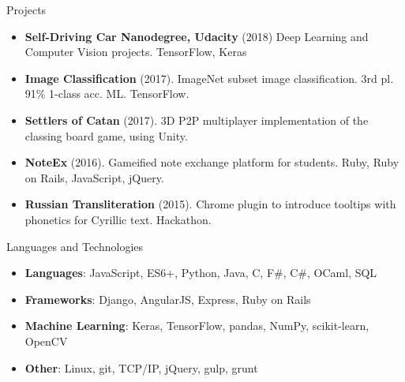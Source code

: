 \documentclass[]{muchicv}
\begin{document}
	\begin{cvsection}{Projects}
		\begin{cvsubsection}{}{}{}
			\begin{itemize}
				\item \textbf{Self-Driving Car Nanodegree, Udacity} (2018) Deep Learning and Computer Vision projects. TensorFlow, Keras
				\item \textbf{Image Classification} (2017). ImageNet subset image classification. 3rd pl. 91\% 1-class acc. ML. TensorFlow.
				\item \textbf{Settlers of Catan} (2017).  3D P2P multiplayer implementation of the classing board game, using Unity.
				\item \textbf{NoteEx} (2016). Gameified note exchange platform for students. Ruby, Ruby on Rails, JavaScript, jQuery.
				\item \textbf{Russian Transliteration} (2015). Chrome plugin to introduce tooltips with phonetics for Cyrillic text. Hackathon.
			\end{itemize}
		\end{cvsubsection}
	\end{cvsection}
	
	\begin{cvsection}{Languages and Technologies}
		\begin{cvsubsection}{}{}{}	
			\begin{itemize}
				\item \textbf{Languages}: JavaScript,  ES6+, Python, Java, C, F\#, C\#, OCaml, SQL 
				\item \textbf{Frameworks}: Django, AngularJS, Express, Ruby on Rails
				\item \textbf{Machine Learning}: Keras, TensorFlow, pandas, NumPy, scikit-learn, OpenCV
				\item \textbf{Other}: Linux, git, TCP/IP, jQuery, gulp, grunt
			\end{itemize}
		\end{cvsubsection}
	\end{cvsection}
	
\end{document}
